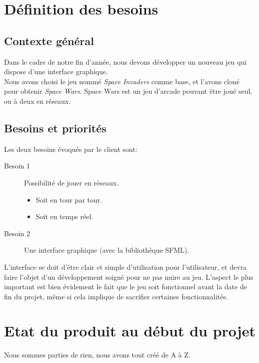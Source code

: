 \documentclass[french, 11pt]{report}
\begin{document}
	\section{Définition des besoins}
	
	\subsection{Contexte général}
	Dans le cadre de notre fin d’année, nous devons développer un nouveau jeu qui dispose d'une interface graphique.\\
	Nous avons choisi le jeu nommé \textit{Space Invaders} comme base, et l'avons cloné pour obtenir \textit{Space Wars}.
	Space Wars est un jeu d'arcade pouvant être joué seul, ou à deux en réseaux.

	\subsection{Besoins et priorités}
	Les deux besoins évoqués par le client sont:
	\begin{description}
		\item[Besoin 1] Possibilité de jouer en réseaux.
		\begin{itemize}
			\item Soit en tour par tour.
			\item Soit en temps réel.
		\end{itemize}
		\item[Besoin 2] Une interface graphique (avec la bibliothèque SFML).
	\end{description}
	
	L’interface se doit d’être clair et simple d’utilisation pour l’utilisateur, et devra faire l’objet
	d’un développement soigné pour ne pas nuire au jeu.
	L’aspect le plus important est bien évidement le fait que le jeu soit fonctionnel avant la date de fin du projet, même si cela implique de sacrifier certaines fonctionnalités.
	
	\section{Etat du produit au début du projet}
	Nous sommes parties de rien, nous avons tout créé de A à Z.
	
\end{document}
